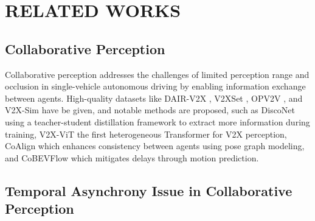 \section{RELATED WORKS}
\subsection{Collaborative Perception}
Collaborative perception addresses the challenges of limited perception range and occlusion in single-vehicle autonomous driving by enabling information exchange between agents. High-quality datasets like DAIR-V2X \cite{cp:Dair-v2x}, V2XSet \cite{cp:v2xvit}, OPV2V \cite{cp:OPV2V}, and V2X-Sim \cite{cp:v2x-sim} have be given, and notable methods are proposed, such as DiscoNet \cite{cp:disconet} using a teacher-student distillation framework to extract more information during training, V2X-ViT \cite{cp:v2xvit} the first heterogeneous Transformer for V2X perception, CoAlign \cite{cp:coalign} which enhances consistency between agents using pose graph modeling, and CoBEVFlow \cite{cp:cobevflow} which mitigates delays through motion prediction.


\subsection{Temporal Asynchrony Issue in Collaborative Perception}

